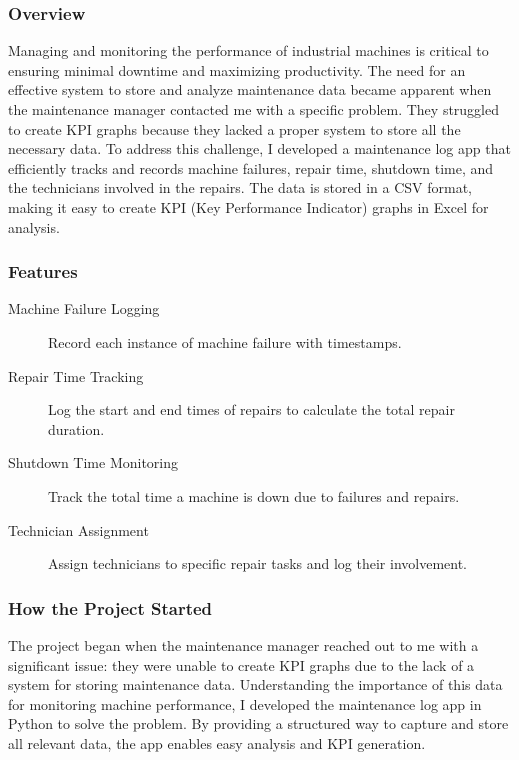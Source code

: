 \documentclass[11pt]{article}
\begin{document}
\subsubsection{Overview}
\label{sec:org484e0d8}
Managing and monitoring the performance of industrial machines is critical to ensuring minimal downtime and maximizing productivity. The need for an effective system to store and analyze maintenance data became apparent when the maintenance manager contacted me with a specific problem. They struggled to create KPI graphs because they lacked a proper system to store all the necessary data. To address this challenge, I developed a maintenance log app that efficiently tracks and records machine failures, repair time, shutdown time, and the technicians involved in the repairs. The data is stored in a CSV format, making it easy to create KPI (Key Performance Indicator) graphs in Excel for analysis.
\subsubsection{Features}
\label{sec:orga4f514a}
\begin{description}
\item[{Machine Failure Logging}] Record each instance of machine failure with timestamps.
\item[{Repair Time Tracking}] Log the start and end times of repairs to calculate the total repair duration.
\item[{Shutdown Time Monitoring}] Track the total time a machine is down due to failures and repairs.
\item[{Technician Assignment}] Assign technicians to specific repair tasks and log their involvement.
\end{description}
\subsubsection{How the Project Started}
\label{sec:org13859be}
The project began when the maintenance manager reached out to me with a significant issue: they were unable to create KPI graphs due to the lack of a system for storing maintenance data. Understanding the importance of this data for monitoring machine performance, I developed the maintenance log app in Python to solve the problem. By providing a structured way to capture and store all relevant data, the app enables easy analysis and KPI generation.
\end{document}
